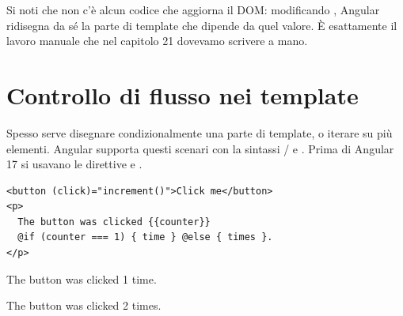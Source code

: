 Si noti che non c'è alcun codice che aggiorna il DOM: modificando
, Angular ridisegna da sé la parte di template che dipende da
quel valore. È esattamente il lavoro manuale che nel capitolo 21 dovevamo
scrivere a mano.

\section{Controllo di flusso nei template}

Spesso serve disegnare condizionalmente una parte di template, o iterare su più
elementi. Angular supporta questi scenari con la sintassi /
e . Prima di Angular 17 si usavano le direttive  e
.

\begin{affianco}[0.46][c]
\begin{lstlisting}[style=html, name=counter.component.html]
<button (click)="increment()">Click me</button>
<p>
  The button was clicked {{counter}}
  @if (counter === 1) { time } @else { times }.
</p>
\end{lstlisting}
\risultato
\begin{browser}[counter = 1]
  \par\vspace{4pt}
  {\Lato\large The button was clicked 1 time.\par}
\end{browser}
\begin{browser}[counter = 2]
  \par\vspace{4pt}
  {\Lato\large The button was clicked 2 times.\par}
\end{browser}
\end{affianco}

